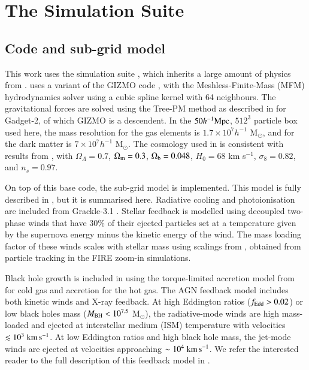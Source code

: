 \section{The \simba{} Simulation Suite}
\label{sec:simba}

\subsection{Code and sub-grid model}

This work uses the \simba{} simulation suite \citep{Dave2019}, which inherits
a large amount of physics from \mufasa{} \citep{Dave2016}. \simba{} uses a
variant of the GIZMO code \citep{Hopkins2015}, with the Meshless-Finite-Mass
(MFM) hydrodynamics solver using a cubic spline kernel with
64 neighbours. The gravitational forces are solved using the Tree-PM method
as described in \citet{Springel2005b} for Gadget-2, of which GIZMO is a
descendent. In the $50 h^{-1}{\rm Mpc}{}$, $512^3$ particle box used here, the mass
resolution for the gas elements is $1.7\times10^7h^{-1}$ M$_\odot$, and for
the dark matter is $7\times10^7h^{-1}$ M$_\odot$. The cosmology used in
\simba{} is consistent with results from \citet{PlanckCollaboration2016},
with $\Omega_\Lambda = 0.7$, $\Omega_{\rm m} = 0.3$, $\Omega_{\rm b} =
0.048$, $H_0 = 68$ km s$^{-1}$, $\sigma_8=0.82$, and $n_s=0.97$.

On top of this base code, the \simba{} sub-grid model is implemented. This
model is fully described in \citet{Dave2019}, but it is summarised here.
Radiative cooling and photoionisation are included from Grackle-3.1
\citep{Smith2016}. Stellar feedback is modelled using decoupled two-phase
winds that have 30\% of their ejected particles set at a temperature given by
the supernova energy minus the kinetic energy of the wind. The mass loading
factor of these winds scales with stellar mass using scalings from
\citet{AnglesAlcazar2017}, obtained from particle tracking in the FIRE
zoom-in simulations.

Black hole growth is included in \simba{} using the torque-limited accretion
model from \citet{AnglesAlcazar2017b} for cold gas and \citet{Bondi1952}
accretion for the hot gas. The AGN feedback model includes both kinetic winds
and X-ray feedback. At high Eddington ratios ($f_{\rm Edd} > 0.02$) or low
black holes mass ($M_{\rm BH} < 10^{7.5}$ M$_\odot$), the radiative-mode
winds are high mass-loaded and ejected at interstellar medium (ISM)
temperature with velocities $\lesssim 10^3 \;{\rm km}\,{\rm s}^{-1}{}$. At low Eddington ratios
and high black hole mass, the jet-mode winds are ejected at velocities
approaching $\sim 10^4\;{\rm km}\,{\rm s}^{-1}{}$. We refer the interested reader to the full
description of this feedback model in \citet{Dave2019}.

